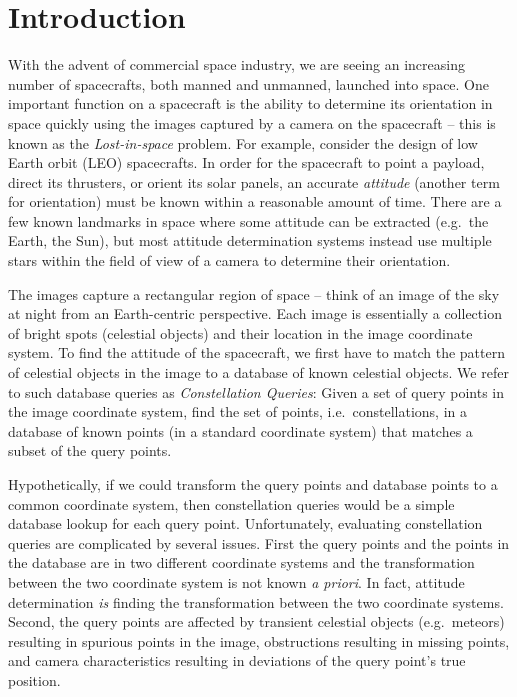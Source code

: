 \newcommand{\imageset}{\texttt{IMG}}
\newcommand{\databaseset}{\texttt{DB}}
\newcommand{\imagesubset}{b}
\newcommand{\databasesubset}{R}
\newcommand{\candidateset}{r}
\newcommand{\solutionmap}{h}

\newcommand{\genericdatabase}{\texttt{X\_DB}}
\newcommand{\angdatabase}{\texttt{ANG\_DB}}
\newcommand{\dotdatabase}{\texttt{DOT\_DB}}
\newcommand{\intdatabase}{\texttt{INT\_DB}}
\newcommand{\sphdatabase}{\texttt{SPH\_DB}}
\newcommand{\plndatabase}{\texttt{PLN\_DB}}
\newcommand{\pyrdatabase}{\texttt{PYR\_DB}}
\newcommand{\comdatabase}{\texttt{COM\_DB}}

\section{Introduction}\label{sec:introduction}
With the advent of commercial space industry, we are seeing an increasing number of spacecrafts, both manned and unmanned, launched into space.
One important function on a spacecraft is the ability to determine its orientation in space quickly using the images captured by a camera on the spacecraft -- this is known as the \textit{Lost-in-space} problem.
For example, consider the design of low Earth orbit (LEO) spacecrafts.
In order for the spacecraft to point a payload, direct its thrusters, or orient its solar panels, an accurate \textit{attitude} (another term for orientation) must be known within a reasonable amount of time.
There are a few known landmarks in space where some attitude can be extracted (e.g.\ the Earth, the Sun), but most attitude determination systems instead use multiple stars within the field of view of a camera to determine their orientation.

The images capture a rectangular region of space -- think of an image of the sky at night from an Earth-centric perspective.
Each image is essentially a collection of bright spots (celestial objects) and their location in the image coordinate system.
To find the attitude of the spacecraft, we first have to match the pattern of celestial objects in the image to a database of known celestial objects.
We refer to such database queries as \textit{Constellation Queries}:
Given a set of query points in the image coordinate system, find the set of points, i.e.\ constellations, in a database of known points (in a standard coordinate system) that matches a subset of the query points.

Hypothetically, if we could transform the query points and database points to a common coordinate system, then constellation queries would be a simple database lookup for each query point.
Unfortunately, evaluating constellation queries are complicated by several issues. 
First the query points and the points in the database are in two different coordinate systems and the transformation between the two coordinate system is not known \emph{a priori}.
In fact, attitude determination \emph{is} finding the transformation between the two coordinate systems.
Second, the query points are affected by transient celestial objects (e.g.\ meteors) resulting in spurious points in the image, obstructions resulting in missing points, and camera characteristics resulting in deviations of the query point's true position.

